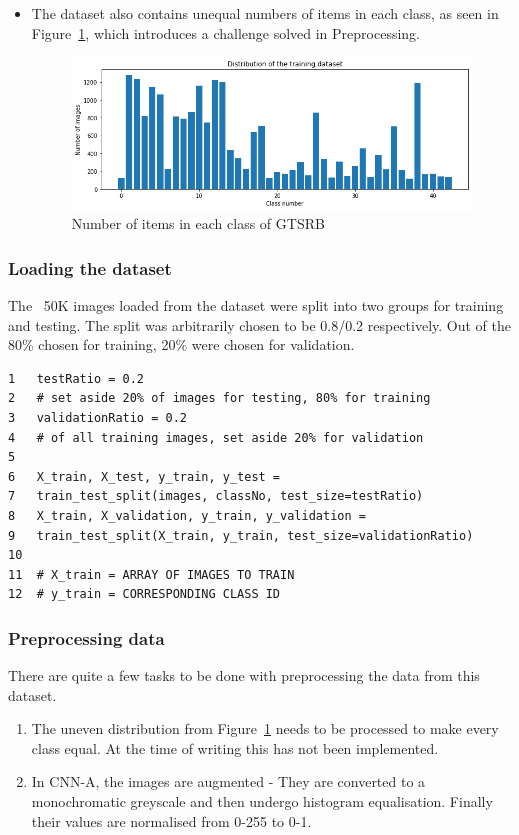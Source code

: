 \documentclass[12pt, landscape]{article}
\begin{document}
\begin{multicols}{3}
\begin{itemize}
    \item The dataset also contains unequal numbers of items in each class, as
    seen in Figure~\ref{fig:figure}, which introduces a challenge solved in
    Preprocessing.
    \begin{figure}[H]
        \centerline{\includegraphics[scale = 0.5]{download.png}}
        \caption{Number of items in each class of GTSRB}
        \label{fig:figure}
    \end{figure}

  \end{itemize}

\subsubsection{Loading the dataset}
The ~50K images loaded from the dataset were split into two groups for training
and testing. The split was arbitrarily chosen to be 0.8/0.2 respectively. Out of
the 80\% chosen for training, 20\% were chosen for validation.

\color{red}
\begin{Verbatim}[fontsize=\small]
1   testRatio = 0.2 
2   # set aside 20% of images for testing, 80% for training
3   validationRatio = 0.2 
4   # of all training images, set aside 20% for validation
5
6   X_train, X_test, y_train, y_test = 
7   train_test_split(images, classNo, test_size=testRatio)
8   X_train, X_validation, y_train, y_validation = 
9   train_test_split(X_train, y_train, test_size=validationRatio)
10 
11  # X_train = ARRAY OF IMAGES TO TRAIN
12  # y_train = CORRESPONDING CLASS ID
\end{Verbatim}
\color{black}

\subsubsection{Preprocessing data}
There are quite a few tasks to be done with preprocessing the data from this
dataset. 
\begin{enumerate}
    \item
    The uneven distribution from Figure~\ref{fig:figure} needs to be processed
    to make every class equal. At the time of writing this has not been
    implemented.
    \item In CNN-A, the images are augmented - They are converted to a
    monochromatic greyscale and then undergo histogram equalisation. Finally
    their values are normalised from 0-255 to 0-1.
\end{enumerate}


\end{multicols}
\end{document}
